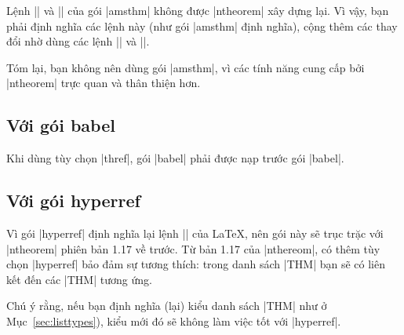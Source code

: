 \medskip
Lệnh |\newtheoremstyle| và |\swapnumbers| của gói |amsthm| không
được |ntheorem| xây dựng lại. Vì vậy,
bạn phải định nghĩa các lệnh này (như gói |amsthm| định nghĩa),
cộng thêm các thay đổi nhờ dùng các lệnh |\theoremheaderfont|
và |\theorembodyfont|.

\medskip
Tóm lại, bạn không nên dùng gói |amsthm|, vì các tính năng
cung cấp bởi |ntheorem| trực quan và thân thiện hơn.

\subsection{\texorpdfstring{Với gói babel}{Voi goi babel}}
\label{sec:babel}

Khi dùng tùy chọn |thref|, gói |babel| phải được nạp trước gói |babel|.

\subsection{\texorpdfstring{Với gói}{Voi goi} hyperref}
\label{sec:hyperref}

Vì gói |hyperref| định nghĩa lại lệnh |\contentsline| của \LaTeX{},
nên gói này sẽ trục trặc với |ntheorem| phiên bản 1.17 về trước.
Từ bản 1.17 của |nthereom|, có thêm tùy chọn |hyperref| bảo đảm
sự tương thích: trong danh sách |THM| bạn sẽ có liên kết đến các |THM| tương ứng.

\medskip
Chú ý rằng,
nếu bạn định nghĩa (lại) kiểu danh sách |THM| như ở Mục~\vref{sec:listtypes}),
kiểu mới đó sẽ không làm việc tốt với |hyperref|.

\endinput
